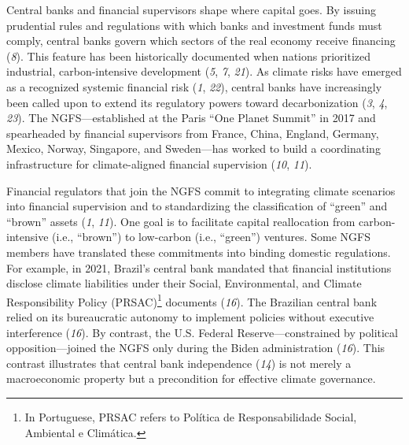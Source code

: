 \documentclass[
  12pt,
  letterpaper,
]{article}
\begin{document}
Central banks and financial supervisors shape where capital goes. By
issuing prudential rules and regulations with which banks and investment
funds must comply, central banks govern which sectors of the real
economy receive financing (\emph{8}). This feature has been historically
documented when nations prioritized industrial, carbon-intensive
development (\emph{5}, \emph{7}, \emph{21}). As climate risks have
emerged as a recognized systemic financial risk (\emph{1}, \emph{22}),
central banks have increasingly been called upon to extend its
regulatory powers toward decarbonization (\emph{3}, \emph{4},
\emph{23}). The NGFS---established at the Paris ``One Planet Summit'' in
2017 and spearheaded by financial supervisors from France, China,
England, Germany, Mexico, Norway, Singapore, and Sweden---has worked to
build a coordinating infrastructure for climate-aligned financial
supervision (\emph{10}, \emph{11}).

Financial regulators that join the NGFS commit to integrating climate
scenarios into financial supervision and to standardizing the
classification of ``green'' and ``brown'' assets (\emph{1}, \emph{11}).
One goal is to facilitate capital reallocation from carbon-intensive
(i.e., ``brown'') to low-carbon (i.e., ``green'') ventures. Some NGFS
members have translated these commitments into binding domestic
regulations. For example, in 2021, Brazil's central bank mandated that
financial institutions disclose climate liabilities under their Social,
Environmental, and Climate Responsibility Policy (PRSAC)\footnote{In
  Portuguese, PRSAC refers to Política de Responsabilidade Social,
  Ambiental e Climática.} documents (\emph{16}). The Brazilian central
bank relied on its bureaucratic autonomy to implement policies without
executive interference (\emph{16}). By contrast, the U.S. Federal
Reserve---constrained by political opposition---joined the NGFS only
during the Biden administration (\emph{16}). This contrast illustrates
that central bank independence (\emph{14}) is not merely a macroeconomic
property but a precondition for effective climate governance.
\end{document}
